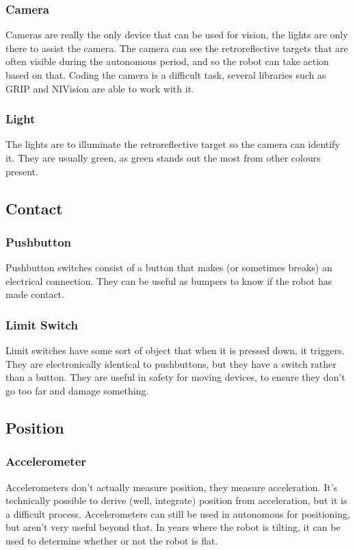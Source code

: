 \documentclass[]{report}
\begin{document}
\subsubsection{Camera}
		Cameras are really the only device that can be used for vision, the lights are only there to assist the camera.
		The camera can see the retroreflective targets that are often visible during the autonomous period, and so the robot can take action based on that.
		Coding the camera is a difficult task, several libraries such as GRIP and NIVision are able to work with it.
\subsubsection{Light}
		The lights are to illuminate the retroreflective target so the camera can identify it.
		They are usually green, as green stands out the most from other colours present.
\subsection{Contact}
	\subsubsection{Pushbutton}
		Pushbutton switches consist of a button that makes (or sometimes breaks) an electrical connection.
		They can be useful as bumpers to know if the robot has made contact.
	\subsubsection{Limit Switch}
		Limit switches have some sort of object that when it is pressed down, it triggers.
		They are electronically identical to pushbuttons, but they have a switch rather than a button.
		They are useful in safety for moving devices, to ensure they don't go too far and damage something.
\subsection{Position}
	\subsubsection{Accelerometer}
		Accelerometers don't actually measure position, they measure acceleration.
		It's technically possible to derive (well, integrate) position from acceleration, but it is a difficult process.
		Accelerometers can still be used in autonomous for positioning, but aren't very useful beyond that.
		In years where the robot is tilting, it can be used to determine whether or not the robot is flat.
\end{document}
